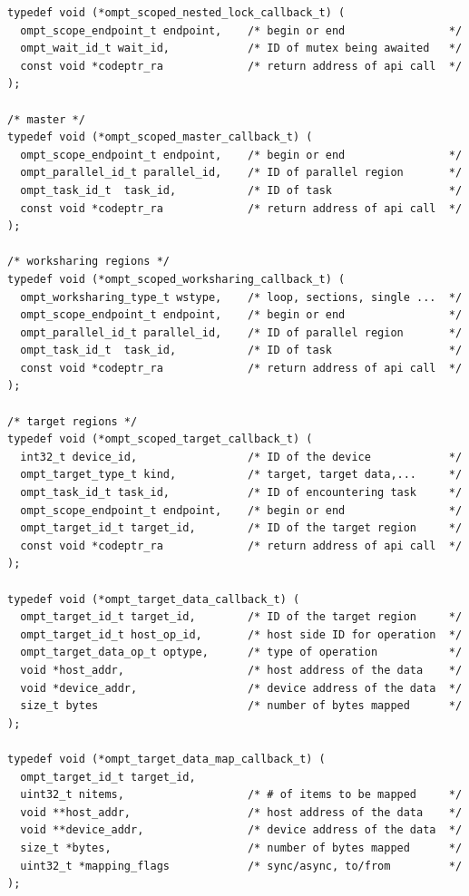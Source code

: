 \documentclass{article}
\begin{document}
\begin{verbatim}
typedef void (*ompt_scoped_nested_lock_callback_t) ( 
  ompt_scope_endpoint_t endpoint,    /* begin or end                */ 
  ompt_wait_id_t wait_id,            /* ID of mutex being awaited   */
  const void *codeptr_ra             /* return address of api call  */          
);

/* master */
typedef void (*ompt_scoped_master_callback_t) ( 
  ompt_scope_endpoint_t endpoint,    /* begin or end                */
  ompt_parallel_id_t parallel_id,    /* ID of parallel region       */
  ompt_task_id_t  task_id,           /* ID of task                  */
  const void *codeptr_ra             /* return address of api call  */
);

/* worksharing regions */
typedef void (*ompt_scoped_worksharing_callback_t) (
  ompt_worksharing_type_t wstype,    /* loop, sections, single ...  */
  ompt_scope_endpoint_t endpoint,    /* begin or end                */
  ompt_parallel_id_t parallel_id,    /* ID of parallel region       */
  ompt_task_id_t  task_id,           /* ID of task                  */
  const void *codeptr_ra             /* return address of api call  */
);

/* target regions */
typedef void (*ompt_scoped_target_callback_t) ( 
  int32_t device_id,                 /* ID of the device            */
  ompt_target_type_t kind,           /* target, target data,...     */
  ompt_task_id_t task_id,            /* ID of encountering task     */     
  ompt_scope_endpoint_t endpoint,    /* begin or end                */ 
  ompt_target_id_t target_id,        /* ID of the target region     */
  const void *codeptr_ra             /* return address of api call  */
);

typedef void (*ompt_target_data_callback_t) (
  ompt_target_id_t target_id,        /* ID of the target region     */
  ompt_target_id_t host_op_id,       /* host side ID for operation  */
  ompt_target_data_op_t optype,      /* type of operation           */
  void *host_addr,                   /* host address of the data    */
  void *device_addr,                 /* device address of the data  */ 
  size_t bytes                       /* number of bytes mapped      */
);

typedef void (*ompt_target_data_map_callback_t) (
  ompt_target_id_t target_id, 
  uint32_t nitems,                   /* # of items to be mapped     */
  void **host_addr,                  /* host address of the data    */
  void **device_addr,                /* device address of the data  */ 
  size_t *bytes,                     /* number of bytes mapped      */
  uint32_t *mapping_flags            /* sync/async, to/from         */
);


\end{verbatim}
\end{document}
